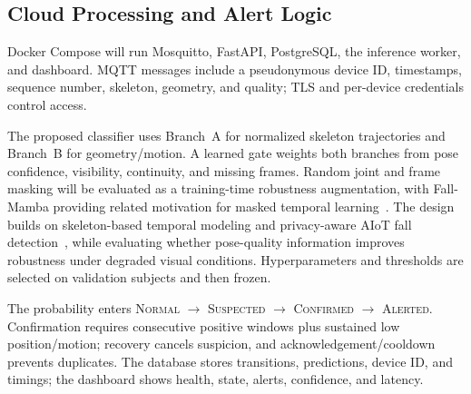 \subsection{Cloud Processing and Alert Logic}

Docker Compose will run Mosquitto, FastAPI, PostgreSQL, the inference worker, and dashboard. MQTT messages include a pseudonymous device ID, timestamps, sequence number, skeleton, geometry, and quality; TLS and per-device credentials control access.

The proposed classifier uses Branch~A for normalized skeleton trajectories and Branch~B for geometry/motion. A learned gate weights both branches from pose confidence, visibility, continuity, and missing frames. Random joint and frame masking will be evaluated as a training-time robustness augmentation, with Fall-Mamba providing related motivation for masked temporal learning~\cite{zhang2025fallmamba}. The design builds on skeleton-based temporal modeling and privacy-aware AIoT fall detection~\cite{yu2025tcnte,mobsite2024aiot}, while evaluating whether pose-quality information improves robustness under degraded visual conditions. Hyperparameters and thresholds are selected on validation subjects and then frozen.

The probability enters \textsc{Normal} $\rightarrow$ \textsc{Suspected} $\rightarrow$ \textsc{Confirmed} $\rightarrow$ \textsc{Alerted}. Confirmation requires consecutive positive windows plus sustained low position/motion; recovery cancels suspicion, and acknowledgement/cooldown prevents duplicates. The database stores transitions, predictions, device ID, and timings; the dashboard shows health, state, alerts, confidence, and latency.
